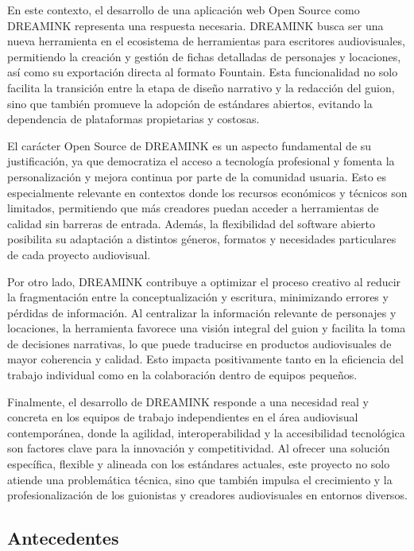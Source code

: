 \documentclass[12pt]{article}
\begin{document}
	En este contexto, el desarrollo de una aplicación web Open Source como DREAMINK representa una respuesta necesaria. DREAMINK busca ser una nueva herramienta en el ecosistema de herramientas para escritores audiovisuales, permitiendo la creación y gestión de fichas detalladas de personajes y locaciones, así como su exportación directa al formato Fountain. Esta funcionalidad no solo facilita la transición entre la etapa de diseño narrativo y la redacción del guion, sino que también promueve la adopción de estándares abiertos, evitando la dependencia de plataformas propietarias y costosas.

	El carácter Open Source de DREAMINK es un aspecto fundamental de su justificación, ya que democratiza el acceso a tecnología profesional y fomenta la personalización y mejora continua por parte de la comunidad usuaria. Esto es especialmente relevante en contextos donde los recursos económicos y técnicos son limitados, permitiendo que más creadores puedan acceder a herramientas de calidad sin barreras de entrada. Además, la flexibilidad del software abierto posibilita su adaptación a distintos géneros, formatos y necesidades particulares de cada proyecto audiovisual.

	Por otro lado, DREAMINK contribuye a optimizar el proceso creativo al reducir la fragmentación entre la conceptualización y escritura, minimizando errores y pérdidas de información. Al centralizar la información relevante de personajes y locaciones, la herramienta favorece una visión integral del guion y facilita la toma de decisiones narrativas, lo que puede traducirse en productos audiovisuales de mayor coherencia y calidad. Esto impacta positivamente tanto en la eficiencia del trabajo individual como en la colaboración dentro de equipos pequeños.

	Finalmente, el desarrollo de DREAMINK responde a una necesidad real y concreta en los equipos de trabajo independientes en el área audiovisual contemporánea, donde la agilidad, interoperabilidad y la accesibilidad tecnológica son factores clave para la innovación y competitividad. Al ofrecer una solución específica, flexible y alineada con los estándares actuales, este proyecto no solo atiende una problemática técnica, sino que también impulsa el crecimiento y la profesionalización de los guionistas y creadores audiovisuales en entornos diversos.

	\newpage

	\subsection{Antecedentes}
\end{document}
